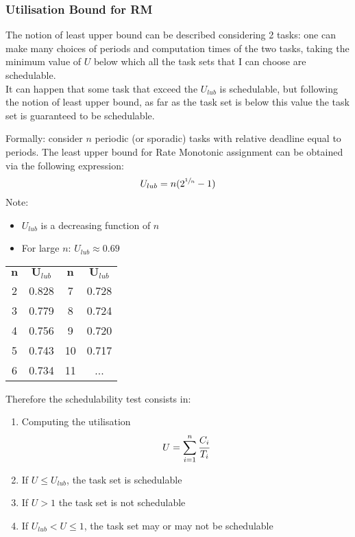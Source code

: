 \subsubsection{Utilisation Bound for RM}
The notion of least upper bound can be described considering 2 tasks: one can make many choices of periods and computation times of the two tasks, taking the minimum value of $U$ below which all the task sets that I can choose are schedulable.\\
It can happen that some task that exceed the $U_{lub}$ is schedulable, but following the notion of least upper bound, as far as the task set is below this value the task set is guaranteed to be schedulable.

Formally: consider $n$ periodic (or sporadic) tasks with relative deadline equal to periods. The least upper bound for Rate Monotonic assignment can be obtained via the following expression:
\[U_{lub} = n(2^{\sfrac{1}{n}} - 1)\]
Note:
\begin{itemize}
\item $U_{lub}$ is a decreasing function of $n$
\item For large $n$: $U_{lub}\approx 0.69$
\end{itemize}

\begin{table}[!h]
\centering
\begin{NiceTabular}[hvlines]{c|c||c|c}
$\mathbf{n}$&$\mathbf{U}_{lub}$&$\mathbf{n}$&$\mathbf{U}_{lub}$\\
2 & 0.828 & 7&0.728\\
3 & 0.779 & 8 & 0.724\\
4 & 0.756 & 9 &0.720\\
5 & 0.743 & 10 & 0.717\\
6 & 0.734 & 11 & ...\\
\end{NiceTabular}
\end{table}

Therefore the schedulability test consists in:
\begin{enumerate}
\item Computing the utilisation
\[U = \sum_{i=1}^{n} \cfrac{C_i}{T_i}\]
\item If $U \le U_{lub}$, the task set is schedulable
\item If $U > 1$ the task set is not schedulable
\item If $U_{lub} < U \le 1$, the task set may or may not be schedulable
\end{enumerate}

